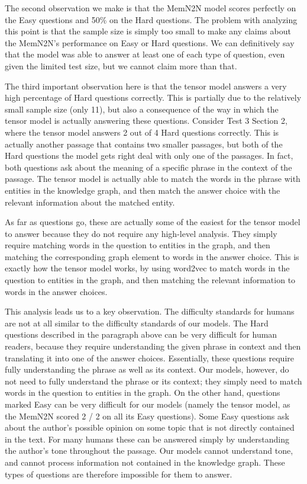 \documentclass[pageno]{jpaper}
\begin{document}
The second observation we make is that the MemN2N model scores perfectly on the
Easy questions and 50\% on the Hard questions. The problem with analyzing this
point is that the sample size is simply too small to make any claims about the
MemN2N's performance on Easy or Hard questions. We can definitively say that
the model was able to answer at least one of each type of question, even given
the limited test size, but we cannot claim more than that.

The third important observation here is that the tensor model answers a very
high percentage of Hard questions correctly. This is partially due to the
relatively small sample size (only 11), but also a consequence of the way in
which the tensor model is actually answering these questions. Consider Test 3
Section 2, where the tensor model answers 2 out of 4 Hard questions correctly.
This is actually another passage that contains two smaller passages, but both of
the Hard questions the model gets right deal with only one of the passages. In
fact, both questions ask about the meaning of a specific phrase in the context
of the passage. The tensor model is actually able to match the words in the
phrase with entities in the knowledge graph, and then match the answer choice
with the relevant information about the matched entity.

As far as questions go, these are actually some of the easiest for the tensor
model to answer because they do not require any high-level analysis. They simply
require matching words in the question to entities in the graph, and then
matching the corresponding graph element to words in the answer choice. This
is exactly how the tensor model works, by using word2vec to match words in the
question to entities in the graph, and then matching the relevant information to
words in the answer choices.

This analysis leads us to a key observation. The difficulty standards for humans
are not at all similar to the difficulty standards of our models. The Hard
questions described in the paragraph above can be very difficult for human
readers, because they require understanding the given phrase in context and then
translating it into one of the answer choices. Essentially, these questions
require fully understanding the phrase as well as its context. Our models,
however, do not need to fully understand the phrase or its context; they simply
need to match words in the question to entities in the graph. On the other hand,
questions marked Easy can be very difficult for our models (namely the tensor model,
as the MemN2N scored 2 / 2 on all its Easy questions). Some Easy questions ask
about the author's possible opinion on some topic that is not directly contained
in the text. For many humans these can be answered simply by understanding the
author's tone throughout the passage. Our models cannot understand tone, and
cannot process information not contained in the knowledge graph. These types
of questions are therefore impossible for them to answer.
\end{document}
